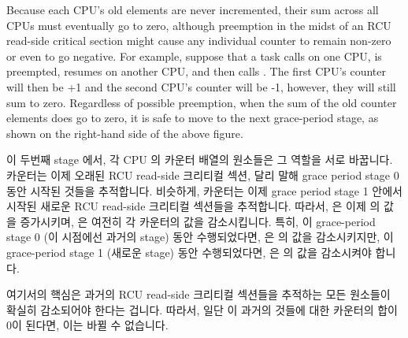 Because each CPU's old  elements are never
incremented, their sum across all CPUs must eventually go to zero,
although preemption in the midst of an RCU read-side critical section might
cause any individual counter to remain non-zero or even to go negative.
For example, suppose that a task calls  on
one CPU, is preempted, resumes on another CPU, and then calls
.
The first CPU's counter will then be +1 and the second CPU's counter
will be -1, however, they will still sum to zero.
Regardless of possible preemption, when the sum of the old counter
elements does go to zero, it is safe to move to the next grace-period
stage, as shown on the right-hand side of the above figure.
\fi

이 두번째 stage 에서, 각 CPU 의  카운터 배열의 원소들은 그
역할을 서로 바꿉니다.
 카운터는 이제 오래된 RCU read-side 크리티컬 섹션, 달리 말해
grace period stage 0 동안 시작된 것들을 추적합니다.
비슷하게,  카운터는 이제 grace period stage 1 안에서 시작된
새로운 RCU read-side 크리티컬 섹션들을 추적합니다.
따라서,  은 이제  의 값을 증가시키며,
 은 여전히 각 카운터의 값을 감소시킵니다.
특히,  이 grace-period stage 0 (이 시점에선 과거의 stage)
동안 수행되었다면,  은  의 값을
감소시키지만,  이 grace-period stage 1 (새로운 stage) 동안
수행되었다면,  은  의 값을 감소시켜야
합니다.

여기서의 핵심은 과거의 RCU read-side 크리티컬 섹션들을 추적하는 모든
 원소들이 확실히 감소되어야 한다는 겁니다.
따라서, 일단 이 과거의 것들에 대한 카운터의 합이 0이 된다면, 이는 바뀔 수
없습니다.

